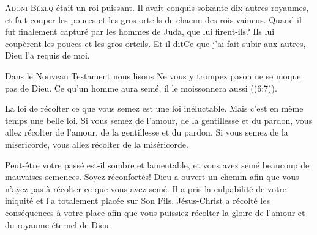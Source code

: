 \dvrule






\lettrine{A}{doni-Bézeq} était un roi puissant.
 Il avait conquis soixante-dix autres royaumes, et fait couper les pouces
 et les gros orteils de chacun des rois vaincus.
 Quand il fut finalement capturé par les hommes de Juda, que lui firent-ils?
 Ils lui coupèrent les pouces et les gros orteils.
 Et il dit\frcolon \Og Ce que j'ai fait subir aux autres, Dieu l'a requis de moi. \Fg{}

Dans le Nouveau Testament nous lisons\frcolon
 \Og Ne vous y trompez pas\frcolon on ne se moque pas de Dieu.
 Ce qu'un homme aura semé, il le moissonnera aussi \Fg{} ((6:7)).


La loi de récolter ce que vous semez est une loi inéluctable.
 Mais c'est en même temps une belle loi.
 Si vous semez de l'amour, de la gentillesse et du pardon,
 vous allez récolter de l'amour, de la gentillesse et du pardon.
 Si vous semez de la miséricorde, vous allez récolter de la miséricorde.

Peut-être votre passé est-il sombre et lamentable,
 et vous avez semé beaucoup de mauvaises semences.
 Soyez réconfortés!
 Dieu a ouvert un chemin afin que vous n'ayez pas à récolter
 ce que vous avez semé.
 Il a pris la culpabilité de votre iniquité et l'a totalement placée
 sur Son Fils.
 Jésus-Christ a récolté les conséquences à votre place
 \ocadr afin que vous puissiez récolter la gloire de l'amour
 et du royaume éternel de Dieu. 

\dvrule



